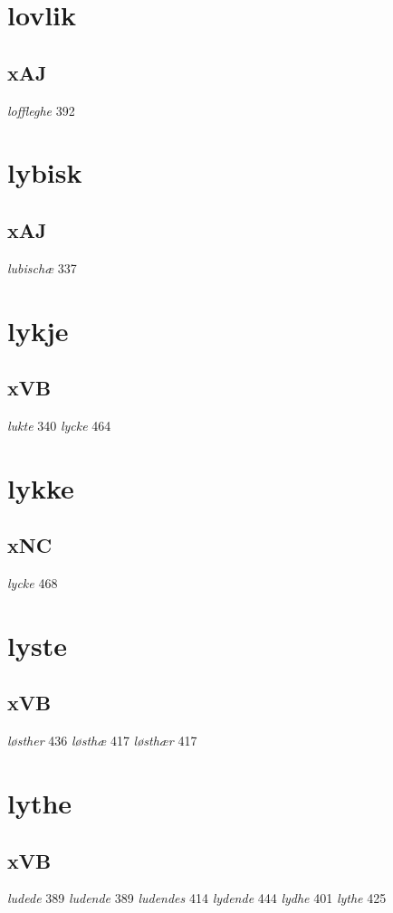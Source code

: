 \documentclass[a4paper,twocolumn]{article}
\begin{document}
\section{lovlik}
\label{sec:orgb49aaee}
\subsection{xAJ}
\label{sec:org3da19bd}
\emph{loffleghe} 392 
\section{lybisk}
\label{sec:orgdf74504}
\subsection{xAJ}
\label{sec:orga8fa375}
\emph{lubischæ} 337 
\section{lykje}
\label{sec:orgd92ed9c}
\subsection{xVB}
\label{sec:org073f445}
\emph{lukte} 340 \emph{lycke} 464 
\section{lykke}
\label{sec:orgaacb341}
\subsection{xNC}
\label{sec:org0a966e9}
\emph{lycke} 468 
\section{lyste}
\label{sec:org667275d}
\subsection{xVB}
\label{sec:org891bd7b}
\emph{løsther} 436 \emph{løsthæ} 417 \emph{løsthær} 417 
\section{lythe}
\label{sec:org9b42161}
\subsection{xVB}
\label{sec:org2a0a259}
\emph{ludede} 389 \emph{ludende} 389 \emph{ludendes} 414 \emph{lydende} 444 \emph{lydhe} 401 \emph{lythe} 425 
\end{document}
